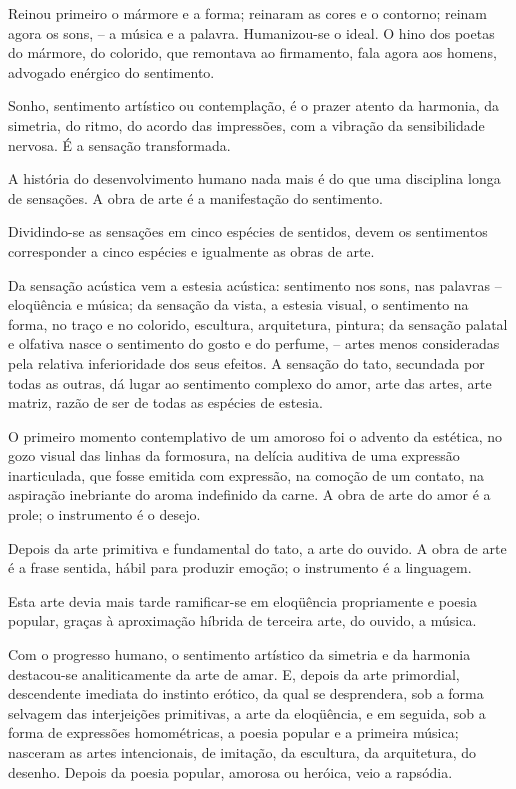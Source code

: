 Reinou primeiro o mármore e a forma; reinaram as cores e o
contorno; reinam agora os sons, -- a música e a palavra.
Humanizou{}-se o ideal. O hino dos poetas do mármore, do colorido, que
remontava ao firmamento, fala agora aos homens, advogado enérgico do
sentimento. 

Sonho, sentimento artístico ou contemplação, é o prazer
atento da harmonia, da simetria, do ritmo, do acordo das impressões,
com a vibração da sensibilidade nervosa. É a sensação transformada.

A história do desenvolvimento humano nada mais é do que uma disciplina
longa de sensações. A obra de arte é a manifestação do sentimento.

Dividindo{}-se as sensações em cinco espécies de sentidos, devem os
sentimentos corresponder a cinco espécies e igualmente as obras de
arte. 

Da sensação acústica vem a estesia acústica: sentimento nos sons,
nas palavras -- eloqüência e música; da sensação da vista, a estesia
visual, o sentimento na forma, no traço e no colorido, escultura,
arquitetura, pintura; da sensação palatal e olfativa nasce o sentimento
do gosto e do perfume, -- artes menos consideradas pela relativa
inferioridade dos seus efeitos. A sensação do tato, secundada por todas
as outras, dá lugar ao sentimento complexo do amor, arte das artes,
arte matriz, razão de ser de todas as espécies de estesia. 

O primeiro
momento contemplativo de um amoroso foi o advento da estética, no gozo
visual das linhas da formosura, na delícia auditiva de uma expressão
inarticulada, que fosse emitida com expressão, na comoção de um
contato, na aspiração inebriante do aroma indefinido da carne. A obra
de arte do amor é a prole; o instrumento é o desejo. 

Depois da arte
primitiva e fundamental do tato, a arte do ouvido. A obra de arte é a
frase sentida, hábil para produzir emoção; o instrumento é a linguagem.

Esta arte devia mais tarde ramificar{}-se em eloqüência propriamente e
poesia popular, graças à aproximação híbrida de terceira arte, do
ouvido, a música. 

Com o progresso humano, o sentimento artístico da
simetria e da harmonia destacou{}-se analiticamente da arte de amar. E,
depois da arte primordial, descendente imediata do instinto erótico, da
qual se desprendera, sob a forma selvagem das interjeições primitivas,
a arte da eloqüência, e em seguida, sob a forma de expressões
homométricas, a poesia popular e a primeira música; nasceram as artes
intencionais, de imitação, da escultura, da arquitetura, do desenho.
Depois da poesia popular, amorosa ou heróica, veio a rapsódia. 

